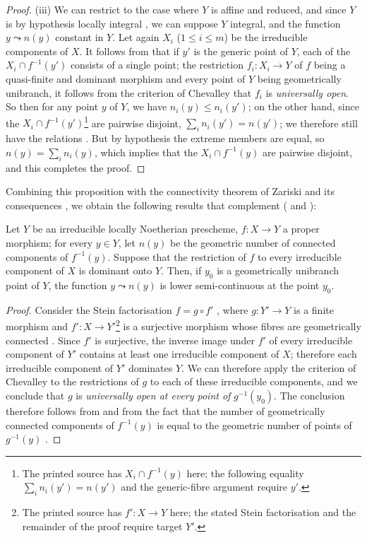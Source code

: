 \begin{proof}
(iii)
We can restrict to the case where $Y$ is affine and reduced, and since $Y$ is by hypothesis locally integral , we can suppose $Y$ integral, and the function $y\leadsto n(y)$ constant in $Y$.
Let again $X_i$ ($1\leq i\leq m$) be the irreducible components of $X$.
It follows from  that if $y'$ is the generic point of $Y$, each of the $X_i\cap f^{-1}(y')$ consists of a single point; the restriction $f_i:X_i\to Y$ of $f$ being a quasi-finite and dominant morphism and every point of $Y$ being geometrically unibranch, it follows from the criterion of Chevalley  that $f_i$ is \emph{universally open}.
So then for any point $y$ of $Y$, we have $n_i(y)\leq n_i(y')$; on the other hand, since the $X_i\cap f^{-1}(y')$\footnote{The printed source has $X_i\cap f^{-1}(y)$ here; the following equality $\sum_i n_i(y')=n(y')$ and the generic-fibre argument require $y'$.} are pairwise disjoint, $\sum_i n_i(y')=n(y')$; we therefore still have the relations .
But by hypothesis the extreme members are equal, so $n(y)=\sum_i n_i(y)$, which implies that the $X_i\cap f^{-1}(y)$ are pairwise disjoint, and this completes the proof.
\end{proof}

Combining this proposition with the connectivity theorem of Zariski and its consequences , we obtain the following results that complement ( and ):

\begin{proposition}[15.5.3]
\label{IV.15.5.3}
Let $Y$ be an irreducible locally Noetherian prescheme, $f:X\to Y$ a proper morphism; for every $y\in Y$, let $n(y)$ be the geometric number of connected components  of $f^{-1}(y)$.
Suppose that the restriction of $f$ to every irreducible component of $X$ is dominant onto $Y$.
Then, if $y_0$ is a geometrically unibranch point of $Y$, the function $y\leadsto n(y)$ is lower semi-continuous at the point $y_0$.
\end{proposition}

\begin{proof}
Consider the Stein factorisation $f=g\circ f'$ , where $g:Y'\to Y$ is a finite morphism and $f':X\to Y'$\footnote{The printed source has $f':X\to Y$ here; the stated Stein factorisation and the remainder of the proof require target $Y'$.} is a surjective morphism whose fibres are geometrically connected .
Since $f'$ is surjective, the inverse image under $f'$ of every irreducible component of $Y'$ contains at least one irreducible component of $X$; therefore each irreducible component of $Y'$ dominates $Y$.
We can therefore apply the criterion of Chevalley  to the restrictions of $g$ to each of these irreducible components, and we conclude that $g$ is \emph{universally open at every point of} $g^{-1}(y_0)$.
The conclusion therefore follows from  and from the fact that the number of geometrically connected components of $f^{-1}(y)$ is equal to the geometric number of points of $g^{-1}(y)$ .
\end{proof}

